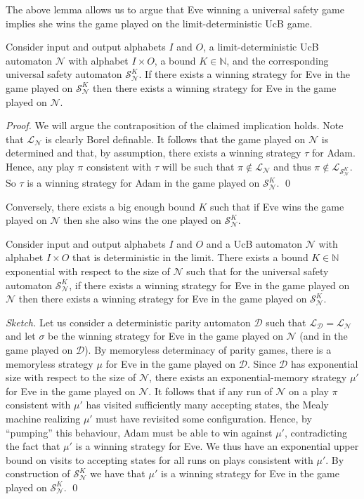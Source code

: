 \documentclass[runningheads,a4paper,draft]{llncs}
\newcommand{\eve}{Eve\xspace}
\newcommand{\adam}{Adam\xspace}
\newcommand{\calN}{\mathcal{N}}
\newcommand{\calS}{\mathcal{S}}
\newcommand{\calD}{\mathcal{D}}
\newcommand{\lang}[1]{\mathcal{L}_{#1}}
\begin{document}
The above lemma allows us to argue that \eve winning a universal safety game
implies she wins the game played on the limit-deterministic UcB game.
\begin{lemma}
    Consider input and output alphabets $I$ and $O$, a limit-deterministic UcB
    automaton $\calN$ with alphabet $I \times O$, a bound $K \in \mathbb{N}$,
    and the corresponding universal safety automaton $\calS^K_\calN$.  If there
    exists a winning strategy for \eve in the game played on $\calS^K_\calN$
    then there exists a winning strategy for \eve in the game played on
    $\calN$.
\end{lemma}
\begin{proof}
    We will argue the contraposition of the claimed implication holds.
    Note that $\lang{\calN}$ is clearly Borel definable. It follows that the
    game played on $\calN$ is determined and that, by assumption, there exists a
    winning strategy $\tau$ for \adam. Hence, any play $\pi$ consistent with
    $\tau$ will be such that $\pi \not\in \lang{\calN}$ and thus $\pi \not\in
    \lang{\calS^K_\calN}$. So $\tau$ is a winning strategy for \adam in the game
    played on $\calS^K_\calN$.
\qed\end{proof}

Conversely, there exists a big enough bound $K$ such that if \eve wins the game
played on $\calN$ then she also wins the one played on $\calS^K_\calN$.
%
\begin{lemma}
    Consider input and output alphabets $I$ and $O$ and a UcB
    automaton $\calN$ with alphabet $I \times O$ that is deterministic in the
    limit. There exists a bound $K \in
    \mathbb{N}$ exponential with respect to the size of $\calN$ such that for
    the universal safety automaton $\calS^K_\calN$, if there exists a winning
    strategy for \eve in the game played on $\calN$ then there exists a winning
    strategy for \eve in the game played on $\calS^K_\calN$.
\end{lemma}
\begin{proof}[Sketch]
    Let us consider a deterministic parity automaton $\calD$ such that
    $\lang{\calD} = \lang{\calN}$ and let $\sigma$ be the winning strategy for
    \eve in the game played on $\calN$ (and in the game played on $\calD$). By
    memoryless determinacy of parity games, there is a memoryless strategy $\mu$
    for \eve in the game played on $\calD$. Since $\calD$ has exponential size
    with respect to the size of $\calN$, there exists an exponential-memory
    strategy $\mu'$ for \eve in the game played on $\calN$. It follows that if
    any run of $\calN$ on a play $\pi$ consistent with $\mu'$ has visited
    sufficiently many accepting states, the Mealy machine realizing $\mu'$ must
    have revisited some configuration. Hence, by ``pumping'' this behaviour,
    \adam must be able to win against $\mu'$, contradicting the fact that $\mu'$
    is a winning strategy for \eve. We thus have an exponential upper bound on
    visits to accepting states for all runs on plays consistent with $\mu'$. By
    construction of $\calS^K_\calN$ we have that $\mu'$ is a winning strategy for
    \eve in the game played on $\calS^K_\calN$.
\qed\end{proof}
\end{document}
